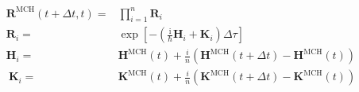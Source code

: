 \documentclass{article}
\newcommand{\I}{\ensuremath{\mathrm{i}}}
\renewcommand{\vec}[1]{\ensuremath{\mathbf{#1}}}
\begin{document}
\begin{align}
  \vec{R}^{\text{MCH}}(t+\Delta t,t)=&
  \prod\limits_{i=1}^{n}
  \vec{R}_i\nonumber\\
  \vec{R}_i=&
  \exp\left[
      -\left(
        \frac{\I}{\hbar}\vec{H}_i
        +\vec{K}_i
      \right)\Delta\tau
  \right]\nonumber\\
  \vec{H}_i=&
  \vec{H}^{\text{MCH}}(t) + \frac{i}{n}
  \left(
    \vec{H}^{\text{MCH}}(t+\Delta t)-\vec{H}^{\text{MCH}}(t)
  \right)\nonumber\\\
  \vec{K}_i=&
  \vec{K}^{\text{MCH}}(t) + \frac{i}{n}
  \left(
    \vec{K}^{\text{MCH}}(t+\Delta t)-\vec{K}^{\text{MCH}}(t)
  \right)
\nonumber\end{align}
\end{document}
